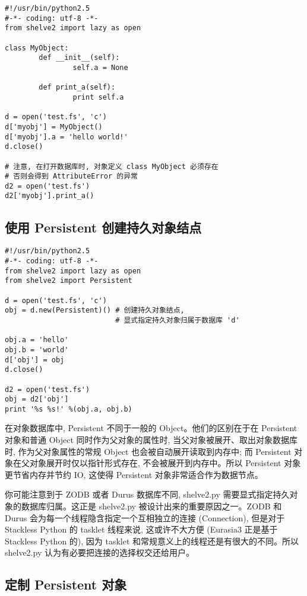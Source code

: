 \documentclass{manual}
\begin{document}
\begin{verbatim}
#!/usr/bin/python2.5
#-*- coding: utf-8 -*-
from shelve2 import lazy as open

class MyObject:
        def __init__(self):
                self.a = None

        def print_a(self):
                print self.a

d = open('test.fs', 'c')
d['myobj'] = MyObject()
d['myobj'].a = 'hello world!'
d.close()

# 注意, 在打开数据库时, 对象定义 class MyObject 必须存在
# 否则会得到 AttributeError 的异常
d2 = open('test.fs')
d2['myobj'].print_a()
\end{verbatim}

\subsection{使用 Persistent 创建持久对象结点}

\begin{verbatim}
#!/usr/bin/python2.5
#-*- coding: utf-8 -*-
from shelve2 import lazy as open
from shelve2 import Persistent

d = open('test.fs', 'c')
obj = d.new(Persistent)() # 创建持久对象结点,
                          # 显式指定持久对象归属于数据库 'd'

obj.a = 'hello'
obj.b = 'world'
d['obj'] = obj
d.close()

d2 = open('test.fs')
obj = d2['obj']
print '%s %s!' %(obj.a, obj.b)
\end{verbatim}

在对象数据库中, Persistent 不同于一般的 Object。他们的区别在于在 Persistent 对象和普通 Object 同时作为父对象的属性时, 当父对象被展开、取出对象数据库时, 作为父对象属性的常规 Object 也会被自动展开读取到内存中; 而 Persistent 对象在父对象展开时仅以指针形式存在, 不会被展开到内存中。所以 Persistent 对象更节省内存并节约 IO, 这使得 Persistent 对象非常适合作为数据节点。

你可能注意到于 ZODB 或者 Durus 数据库不同, shelve2.py 需要显式指定持久对象的数据库归属。这正是 shelve2.py 被设计出来的重要原因之一。ZODB 和 Durus 会为每一个线程隐含指定一个互相独立的连接 (Connection), 但是对于 Stackless Python 的 tasklet 线程来说, 这或许不大方便 (Eurasia3 正是基于 Stackless Python 的), 因为 tasklet 和常规意义上的线程还是有很大的不同。所以 shelve2.py 认为有必要把连接的选择权交还给用户。 

\subsection{定制 Persistent 对象}
\end{document}
